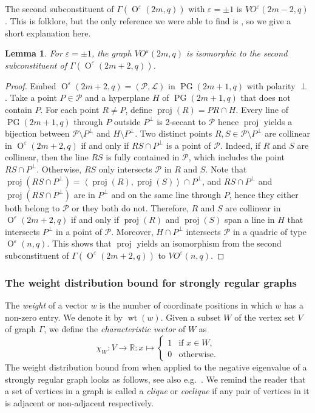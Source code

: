 \documentclass[a4paper]{article}
\newtheorem{lm}[thm]{Lemma}
\theoremstyle{definition}
\newcommand{\eps}{\varepsilon}
\newcommand{\RR}{\mathbb R}
\newcommand{\vspan}[1]{\left\langle #1 \right\rangle}
\newcommand{\ml}{\mathcal L}
\renewcommand{\mp}{\mathcal P}
\DeclareMathOperator{\wt}{wt}
\DeclareMathOperator{\PG}{PG}
\newcommand{\pg}{\PG}
\DeclareMathOperator{\proj}{proj}
\DeclareMathOperator{\OO}{O}
\begin{document}
The second subconstituent of $\Gamma(\OO^\eps(2m,q))$ with $\eps = \pm 1$ is $VO^\eps(2m-2,q)$.
This is folklore, but the only reference we were able to find is \cite{SageMath}, so we give a short explanation here.

\begin{lm}
 For $\eps=\pm1$, the graph $VO^\eps(2m,q)$ is isomorphic to the second subconstituent of $\Gamma(\OO^\eps(2m+2,q))$.
\end{lm}

\begin{proof}
 Embed $\OO^\eps(2m+2,q) = (\mp,\ml)$ in $\pg(2m+1,q)$ with polarity $\perp$.
 Take a point $P \in \mp$ and a hyperplane $H$ of $\pg(2m+1,q)$ that does not contain $P$.
 For each point $R \neq P$, define $\proj(R) = PR \cap H$.
 Every line of $\pg(2m+1,q)$ through $P$ outside $P^\perp$ is 2-secant to $\mp$ hence $\proj$ yields a bijection between $\mp \setminus P^\perp$ and $H \setminus P^\perp$.
 Two distinct points $R,S \in \mp \setminus P^\perp$ are collinear in $\OO^\eps(2m+2,q)$ if and only if $RS \cap P^\perp$ is a point of $\mp$.
 Indeed, if $R$ and $S$ are collinear, then the line $RS$ is fully contained in $\mp$, which includes the point $RS \cap P^\perp$.
 Otherwise, $RS$ only intersects $\mp$ in $R$ and $S$.
 Note that $\proj(RS \cap P^\perp) = \vspan{\proj(R), \proj(S)} \cap P^\perp$, and $RS \cap P^\perp$ and $\proj(RS \cap P^\perp)$ are in $P^\perp$ and on the same line through $P$, hence they either both belong to $\mp$ or they both do not.
 Therefore, $R$ and $S$ are collinear in $\OO^\eps(2m+2,q)$ if and only if $\proj(R)$ and $\proj(S)$ span a line in $H$ that intersects $P^\perp$ in a point of $\mp$.
 Moreover, $H \cap P^\perp$ intersects $\mp$ in a quadric of type $\OO^\eps(n,q)$.
 This shows that $\proj$ yields an isomorphism from the second subconstituent of $\Gamma(\OO^\eps(2m+2,q))$ to $VO^\eps(n,q)$.
\end{proof}

\subsubsection{The weight distribution bound for strongly regular graphs}

The \emph{weight} of a vector $w$ is the number of coordinate positions in which $w$ has a non-zero entry.
We denote it by $\wt(w)$.
Given a subset $W$ of the vertex set $V$ of graph $\Gamma$, we define the \emph{characteristic vector} of $W$ as
\[
 \chi_W: V \to \RR: x \mapsto \begin{cases}
  1 & \text{if } x \in W, \\
  0 & \text{otherwise}.
 \end{cases}
\]
The weight distribution bound from \cite[Corollary 1]{Krotov} when applied to the negative eigenvalue of a strongly regular graph looks as follows, see also e.g.\ \cite[Lemma 4]{Evans}.
We remind the reader that a set of vertices in a graph is called a \emph{clique} or \emph{coclique} if any pair of vertices in it is adjacent or non-adjacent respectively.
\end{document}
